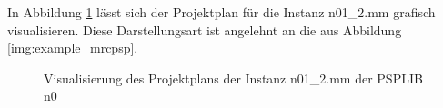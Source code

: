 In Abbildung \ref{img:psplib_n0_example} lässt sich der Projektplan für die Instanz n01\_2.mm grafisch visualisieren. Diese Darstellungsart ist angelehnt an die aus Abbildung \ref{img:example_mrcpsp}.

\begin{figure}[H]
    \centering
    \noindent{}
    \caption{Visualisierung des Projektplans der Instanz n01\_2.mm der PSPLIB n0} 
    \label{img:psplib_n0_example}
\end{figure}
